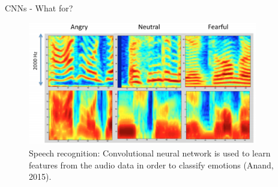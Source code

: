 \begin{vbframe}{CNNs - What for?}
  \begin{figure}
    \centering
    \includegraphics[width=10cm]{figure/speech.png}
    \caption{Speech recognition: Convolutional neural network is used to learn features from the audio data in order to classify emotions (Anand, 2015).}
  \end{figure}
\end{vbframe}
